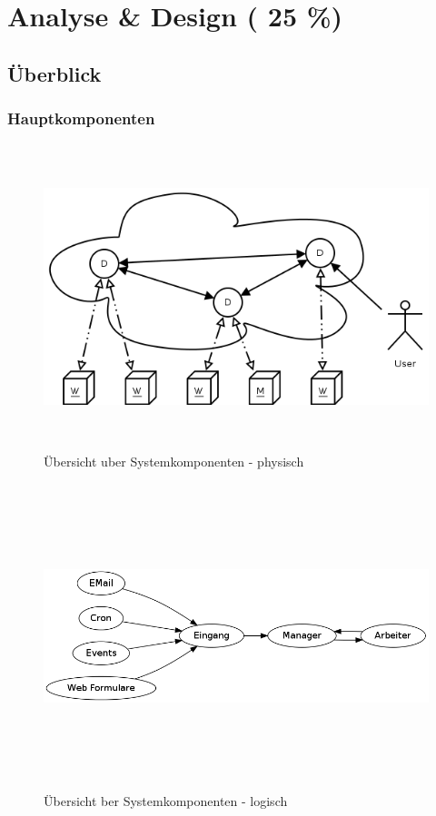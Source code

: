 \chapter{Analyse \& Design ( 25 \%)}






\section{\"Uberblick}
\subsection{Hauptkomponenten}


\begin{figure}[ht] 
  \label{fig:grob-layout-komponenten}
  \begin{center}
      \includegraphics[height=3.5in]{imageinput/grob-layout-komponenten.png}
  \end{center}
  \caption{\"Ubersicht uber Systemkomponenten - physisch}
\end{figure}


\begin{figure}[ht]
  \label{fig:grob-layout-komponenten-logisch}
  \begin{center}
      \includegraphics[height=3.5in]{imageinput/grob-layout-komponenten-logisch.png}
  \end{center}
  \caption{\"Ubersicht ber Systemkomponenten - logisch}
\end{figure}


